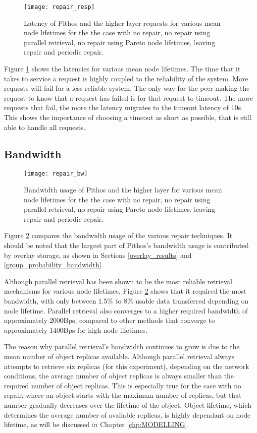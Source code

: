 \begin{figure}[htbp]
 \centering
 \texttt{[image: repair\_resp]}
 \caption{Latency of Pithos and the higher layer requests for various mean node lifetimes for the the case with no repair, no repair using parallel retrieval, no repair using Pareto node lifetimes, leaving repair and periodic repair.}
 \label{fig_repair_resp}
\end{figure}
%
Figure \ref{fig_repair_resp} shows the latencies for various mean node lifetimes. The time that it takes to service a request is highly coupled to the reliability of the system. More requests will fail for a less reliable system. The only way for the peer making the request to know that a request has failed is for that request to timeout. The more requests that fail, the more the latency migrates to the timeout latency of 10s. This shows the importance of choosing a timeout as short as possible, that is still able to handle all requests.

\subsection{Bandwidth}

\begin{figure}[htbp]
 \centering
 \texttt{[image: repair\_bw]}
 \caption{Bandwidth usage of Pithos and the higher layer for various mean node lifetimes for the the case with no repair, no repair using parallel retrieval, no repair using Pareto node lifetimes, leaving repair and periodic repair.}
 \label{fig_repair_bw}
\end{figure}
%
Figure \ref{fig_repair_bw} compares the bandwidth usage of the various repair techniques. It should be noted that the largest part of Pithos's bandwidth usage is contributed by overlay storage, as shown in Sections \ref{overlay_results} and \ref{group_probability_bandwidth}.

Although parallel retrieval has been shown to be the most reliable retrieval mechanisms for various node lifetimes, Figure \ref{fig_repair_bw} shows that it required the most bandwidth, with only between 1.5\% to 8\% usable data transferred depending on node lifetime. Parallel retrieval also converges to a higher required bandwidth of approximately 2000Bps, compared to other methods that converge to approximately 1400Bps for high node lifetimes.

The reason why parallel retrieval's bandwidth continues to grow is due to the mean number of object replicas available. Although parallel retrieval always attempts to retrieve six replicas (for this experiment), depending on the network conditions, the average number of object replicas is always smaller than the required number of object replicas. This is especially true for the case with no repair, where an object starts with the maximum number of replicas, but that number gradually decreases over the lifetime of the object. Object lifetime, which determines the average number of available replicas, is highly dependant on node lifetime, as will be discussed in Chapter \ref{chp:MODELLING}.

